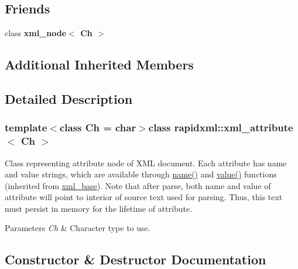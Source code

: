 \subsection*{Friends}
\begin{DoxyCompactItemize}
\item 
\hypertarget{classrapidxml_1_1xml__attribute_aa7e464ce3fe512598ff8dda47291941f}{}class {\bfseries xml\+\_\+node$<$ Ch $>$}\label{classrapidxml_1_1xml__attribute_aa7e464ce3fe512598ff8dda47291941f}

\end{DoxyCompactItemize}
\subsection*{Additional Inherited Members}


\subsection{Detailed Description}
\subsubsection*{template$<$class Ch = char$>$class rapidxml\+::xml\+\_\+attribute$<$ Ch $>$}

Class representing attribute node of X\+M\+L document. Each attribute has name and value strings, which are available through \hyperlink{classrapidxml_1_1xml__base_a9a09739310469995db078ebd0da3ed45}{name()} and \hyperlink{classrapidxml_1_1xml__base_adcdaccff61c665f039d9344e447b7445}{value()} functions (inherited from \hyperlink{classrapidxml_1_1xml__base}{xml\+\_\+base}). Note that after parse, both name and value of attribute will point to interior of source text used for parsing. Thus, this text must persist in memory for the lifetime of attribute. 
\begin{DoxyParams}{Parameters}
{\em Ch} & Character type to use. \\
\hline
\end{DoxyParams}


\subsection{Constructor \& Destructor Documentation}
\hypertarget{classrapidxml_1_1xml__attribute_a26be291103917d3e8de110d46dd83816}{}
